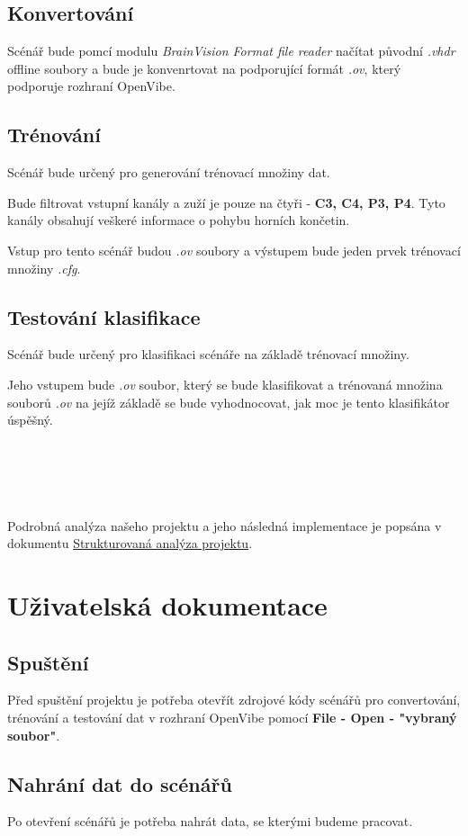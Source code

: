 \documentclass{report}
\begin{document}
\section{Konvertování}
%
Scénář bude pomcí modulu \textit{BrainVision Format file reader} načítat původní \textit{.vhdr} offline soubory a bude je konvenrtovat na podporující formát \textit{.ov}, který podporuje rozhraní OpenVibe.
%
\section{Trénování}
Scénář bude určený pro generování trénovací množiny dat.

Bude filtrovat vstupní kanály a zuží je pouze na čtyři - \textbf{C3, C4, P3, P4}. Tyto kanály obsahují veškeré informace o pohybu horních končetin.

Vstup pro tento scénář budou \textit{.ov} soubory a výstupem bude jeden prvek trénovací množiny \textit{.cfg}.
%
\section{Testování klasifikace}
Scénář bude určený pro klasifikaci scénáře na základě trénovací množiny.

Jeho vstupem bude \textit{.ov} soubor, který se bude klasifikovat a trénovaná množina souborů \textit{.ov} na jejíž základě se bude vyhodnocovat, jak moc je tento klasifikátor úspěšný.
\\
\\
\\
\\
\\
\\
Podrobná analýza našeho projektu a jeho následná implementace je popsána v dokumentu
\href{https://docs.google.com/document/d/1DZhPO0-b6VwDLwlwbTCjLrkphk3x23aponyvLbC3uOU/edit?usp=sharing}{Strukturovaná analýza projektu}.


\chapter{Uživatelská dokumentace}
\section{Spuštění}
Před spuštění projektu je potřeba otevřít zdrojové kódy scénářů pro convertování, trénování a testování dat v rozhraní OpenVibe pomocí \textbf{File - Open - "vybraný soubor"}.

 
\section{Nahrání dat do scénářů}
Po otevření scénářů je potřeba nahrát data, se kterými budeme pracovat.
\end{document}
